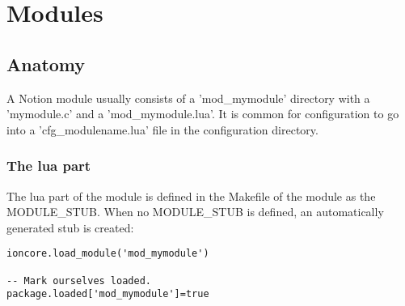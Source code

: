 \section{Modules}

\subsection{Anatomy}

A Notion module usually consists of a 'mod\_mymodule' directory with a 
'mymodule.c' and a 'mod\_mymodule.lua'. It is common for configuration
to go into a 'cfg\_modulename.lua' file in the configuration directory.

\subsubsection{The lua part}

The lua part of the module is defined in the Makefile of the module as the
MODULE\_STUB. When no MODULE\_STUB is defined, an automatically generated
stub is created:

\begin{verbatim}
ioncore.load_module('mod_mymodule')

-- Mark ourselves loaded. 
package.loaded['mod_mymodule']=true
\end{verbatim}
